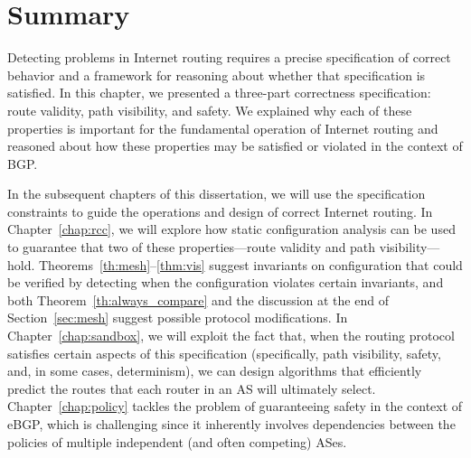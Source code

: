 \section{Summary}

Detecting problems in Internet routing requires a precise
specification of correct behavior and a framework for reasoning about
whether that specification is satisfied.  In this chapter, we presented
a three-part correctness specification: route validity, path visibility,
and safety. We explained why each of these properties is important for the
fundamental operation of Internet routing and reasoned about how these
properties may be satisfied or violated in the context of BGP.

In the subsequent chapters of this dissertation, we will use the
specification constraints to guide the operations and design of correct
Internet routing.  In Chapter~\ref{chap:rcc}, we will explore how static
configuration analysis can be used to guarantee that two of these
properties---route validity and path
visibility---hold. 
Theorems~\ref{th:mesh}--\ref{thm:vis}
suggest invariants on
configuration that could be verified by detecting when the configuration
violates certain invariants, and both Theorem~\ref{th:always_compare}
and the discussion at the end of
Section~\ref{sec:mesh}
suggest possible protocol modifications.  In
Chapter~\ref{chap:sandbox}, we will exploit the fact that, when the
routing protocol satisfies certain aspects of this specification
(specifically, path visibility, safety, and, in some cases,
determinism), we can design algorithms that efficiently predict the
routes that each router in an AS will ultimately select.
Chapter~\ref{chap:policy} tackles the problem of guaranteeing safety in
the context of eBGP, which is challenging since it inherently involves
dependencies between the policies of multiple independent (and often
competing) ASes.

